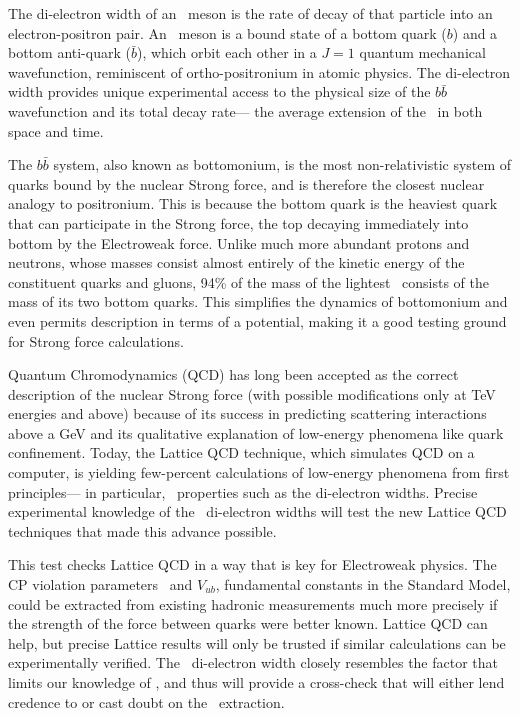 \documentclass{cornell}
\begin{document}
The di-electron width of an \ups\ meson is the rate of decay of that
particle into an electron-positron pair.  An \ups\ meson is a bound
state of a bottom quark ($b$) and a bottom anti-quark ($\bar{b}$),
which orbit each other in a $J=1$ quantum mechanical wavefunction,
reminiscent of ortho-positronium in atomic physics.  The di-electron
width provides unique experimental access to the physical size of the
$b\bar{b}$ wavefunction and its total decay rate--- the average
extension of the \ups\ in both space and time.

The $b\bar{b}$ system, also known as bottomonium, is the most
non-relativistic system of quarks bound by the nuclear Strong force,
and is therefore the closest nuclear analogy to positronium.  This is
because the bottom quark is the heaviest quark that can participate in
the Strong force, the top decaying immediately into bottom by the
Electroweak force.  Unlike much more abundant protons and neutrons,
whose masses consist almost entirely of the kinetic energy of the
constituent quarks and gluons, 94\% of the mass of the lightest \ups\
consists of the mass of its two bottom quarks.  This simplifies the
dynamics of bottomonium and even permits description in terms of a
potential, making it a good testing ground for Strong force
calculations.

Quantum Chromodynamics (QCD) has long been accepted as the correct
description of the nuclear Strong force (with possible modifications
only at TeV energies and above) because of its success in predicting
scattering interactions above a GeV and its qualitative explanation
of low-energy phenomena like quark confinement.  Today, the Lattice
QCD technique, which simulates QCD on a computer, is yielding
few-percent calculations of low-energy phenomena from first
principles--- in particular, \ups\ properties such as the di-electron
widths.  Precise experimental knowledge of the \ups\ di-electron
widths will test the new Lattice QCD techniques that made this advance
possible.

This test checks Lattice QCD in a way that is key for Electroweak
physics.  The CP violation parameters \vtd\ and $V_{ub}$, fundamental
constants in the Standard Model, could be extracted from existing
hadronic measurements much more precisely if the strength of the force
between quarks were better known.  Lattice QCD can help, but precise
Lattice results will only be trusted if similar calculations can be
experimentally verified.  The \ups\ di-electron width closely
resembles the factor that limits our knowledge of \vtd, and thus will
provide a cross-check that will either lend credence to or cast doubt
on the \vtd\ extraction.
\end{document}
